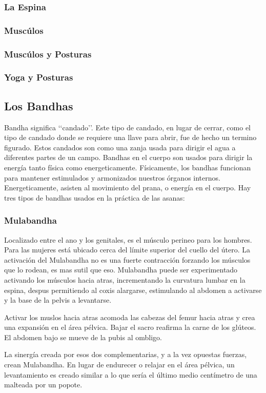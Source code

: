 \documentclass[a4paper]{article}
\begin{document}
\subsubsection{La Espina}
\subsubsection{Muscúlos}
\subsubsection{Muscúlos y Posturas}
\subsubsection{Yoga y Posturas}
\newpage
\subsection{Los Bandhas}
Bandha significa \lq\lq candado\rq\rq. Este tipo de candado, en lugar de cerrar, como el tipo de candado donde se requiere una llave para abrir, fue de hecho un termino figurado. Estos candados son como una zanja usada para dirigir el agua a diferentes partes de un campo. Bandhas en el cuerpo son usados para dirigir la energía tanto física como energeticamente. Físicamente, los bandhas funcionan para mantener estimulados y armonizados nuestros órganos internos. Energeticamente, asisten al movimiento del prana, o energía en el cuerpo. Hay tres tipos de bandhas usados en la práctica de las asanas:

\subsubsection{Mulabandha}
Localizado entre el ano y los genitales, es el músculo perineo para los hombres. Para las mujeres está ubicado cerca del límite superior del cuello del útero. La activación del Mulabandha no es una fuerte contracción forzando los músculos que lo rodean, es mas sutil que eso. Mulabandha puede ser experimentado activando los músculos hacia atras, incrementando la curvatura lumbar en la espina, despus permitiendo al coxis alargarse, estimulando al abdomen a activarse y la base de la pelvis a levantarse.

Activar los muslos hacia atras acomoda las cabezas del femur hacia atras y crea una expansión en el área pélvica.
Bajar el sacro reafirma la carne de los glúteos. El abdomen bajo se mueve de la pubis al ombligo.

La sinergía creada por esos dos complementarias, y a la vez opuestas fuerzas, crean Mulabandha. En lugar de endurecer o relajar en el área pélvica, un levantamiento es creado similar a lo que sería el último medio centímetro de una malteada por un popote.
\end{document}
